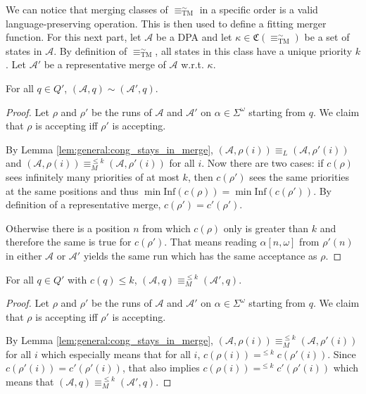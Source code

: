 We can notice that merging classes of $\equiv_\text{TM}^\sim$ in a specific order is a valid language-preserving operation. This is then used to define a fitting merger function. For this next part, let $\mathcal{A}$ be a DPA and let $\kappa \in \mathfrak{C}(\equiv^\sim_\text{TM})$ be a set of states in $\mathcal{A}$. By definition of $\equiv^\sim_\text{TM}$, all states in this class have a unique priority $k$. Let $\mathcal{A}'$ be a representative merge of $\mathcal{A}$ w.r.t. $\kappa$.

\begin{lem}
	For all $q \in Q'$, $(\mathcal{A}, q) \sim (\mathcal{A}', q)$.
	\label{lem:tremoore:merge_keep_sim}
\end{lem}

\begin{proof} 
	Let $\rho$ and $\rho'$ be the runs of $\mathcal{A}$ and $\mathcal{A}'$ on $\alpha \in \Sigma^\omega$ starting from $q$. We claim that $\rho$ is accepting iff $\rho'$ is accepting.
	
	By Lemma \ref{lem:general:cong_stays_in_merge}, $(\mathcal{A}, \rho(i)) \equiv_L (\mathcal{A}, \rho'(i))$ and $(\mathcal{A}, \rho(i)) \equiv_M^{\leq k} (\mathcal{A}, \rho'(i))$ for all $i$. Now there are two cases: if $c(\rho)$ sees infinitely many priorities of at most $k$, then $c(\rho')$ sees the same priorities at the same positions and thus $\min \text{Inf}(c(\rho)) = \min \text{Inf}(c(\rho'))$. By definition of a representative merge, $c(\rho') = c'(\rho')$.
	
	 Otherwise there is a position $n$ from which $c(\rho)$ only is greater than $k$ and therefore the same is true for $c(\rho')$. That means reading $\alpha[n,\omega]$ from $\rho'(n)$ in either $\mathcal{A}$ or $\mathcal{A}'$ yields the same run which has the same acceptance as $\rho$.
\end{proof}

\begin{lem}
	For all $q \in Q'$ with $c(q) \leq k$, $(\mathcal{A}, q) \equiv_M^{\leq k} (\mathcal{A}', q)$.
	\label{lem:tremoore:merge_keep_tmoore}
\end{lem}

\begin{proof} %
	Let $\rho$ and $\rho'$ be the runs of $\mathcal{A}$ and $\mathcal{A}'$ on $\alpha \in \Sigma^\omega$ starting from $q$. We claim that $\rho$ is accepting iff $\rho'$ is accepting.
	
	By Lemma \ref{lem:general:cong_stays_in_merge}, $(\mathcal{A}, \rho(i)) \equiv_M^{\leq k} (\mathcal{A}, \rho'(i))$ for all $i$ which especially means that for all $i$, $c(\rho(i)) =^{\leq k} c(\rho'(i))$. Since $c(\rho'(i)) = c'(\rho'(i))$, that also implies $c(\rho(i)) =^{\leq k} c'(\rho'(i))$ which means that $(\mathcal{A}, q) \equiv_M^{\leq k} (\mathcal{A}', q)$.
\end{proof}

